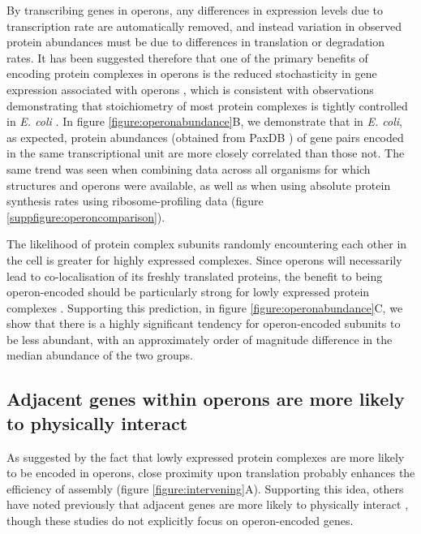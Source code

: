 \documentclass[a4paper,11pt,twoside,openright]{scrbook}
\begin{document}
By transcribing genes in operons, any differences in expression levels due to
transcription rate are automatically removed, and instead variation in observed
protein abundances must be due to differences in translation or degradation
rates. It has been suggested therefore that one of the primary benefits of
encoding protein complexes in operons is the reduced stochasticity in gene
expression associated with operons \cite{Swain2004,Sneppen2010,Shieh2015a},
which is consistent with observations demonstrating that stoichiometry of most
protein complexes is tightly controlled in \textit{E. coli} \cite{Li2014b}. In
figure \ref{figure:operonabundance}B, we demonstrate that in \textit{E. coli},
as expected, protein abundances (obtained from PaxDB \cite{Wang2015}) of gene
pairs encoded in the same transcriptional unit are more closely correlated than
those not. The same trend was seen when combining data across all organisms for
which structures and operons were available, as well as when using absolute
protein synthesis rates using ribosome-profiling data \cite{Li2014b} (figure
\ref{suppfigure:operoncomparison}).

The likelihood of protein complex subunits randomly encountering each other in
the cell is greater for highly expressed complexes. Since operons will
necessarily lead to co-localisation of its freshly translated proteins, the
benefit to being operon-encoded should be particularly strong for lowly
expressed protein complexes \cite{Swain2002,Kovacs2009}. Supporting this
prediction, in figure \ref{figure:operonabundance}C, we show that there is a
highly significant tendency for operon-encoded subunits to be less abundant,
with an approximately order of magnitude difference in the median abundance of
the two groups.

\subsection{Adjacent genes within operons are more likely to physically
interact}
As suggested by the fact that lowly expressed protein complexes are more likely
to be encoded in operons, close proximity upon translation probably enhances the
efficiency of assembly (figure \ref{figure:intervening}A). Supporting this idea,
others have noted previously that adjacent genes are more likely to physically
interact \cite{Mushegian1996,Dandekar1998}, though these studies do not
explicitly focus on operon-encoded genes.
\end{document}
